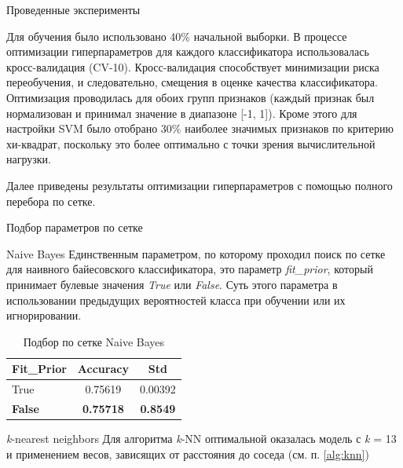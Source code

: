 

\begin{section}{Проведенные эксперименты}

Для обучения было использовано 40\% начальной выборки. В процессе оптимизации гиперпараметров для каждого классификатора использовалась кросс-валидация (CV-10). Кросс-валидация способствует минимизации риска  переобучения, и следовательно,  смещения в оценке качества классификатора. Оптимизация проводилась для обоих групп признаков (каждый признак был нормализован и принимал значение в диапазоне [-1, 1]). Кроме этого для настройки SVM было отобрано 30\% наиболее значимых признаков по критерию хи-квадрат, поскольку это более оптимально с точки зрения вычислительной нагрузки.

Далее приведены результаты оптимизации гиперпараметров с помощью полного перебора по сетке.

\begin{subsection}{Подбор параметров по сетке}

\begin{subsubsection}{Naive Bayes}
Единственным параметром, по которому проходил поиск по сетке для наивного байесовского классификатора, это параметр \textit{fit\_prior}, который принимает булевые значения \textit{True} или \textit{False}. Суть этого параметра в использовании предыдущих вероятностей класса при обучении или их игнорировании.

\begin{table}[H]
\centering
{\begin{tabular}{|l|c|c|}
\hline
\textbf{Fit\_Prior} & \textbf{Accuracy} & \textbf{Std} \\
\hline
True & 0.75619  & 0.00392 \\
\hline
\textbf{False} & \textbf{0.75718}  & \textbf{0.8549} \\
\hline
\end{tabular}}

\caption{Подбор по сетке Naive Bayes}
\label{grid:nb}
\end{table}



\end{subsubsection}



\begin{subsubsection}{\textit{k}-nearest neighbors}
  Для алгоритма \textit{k}-NN оптимальной оказалась модель с \textit{k} = 13 и применением весов, зависящих от расстояния до соседа (см. п. \ref{alg:knn})


\end{subsubsection}
\end{subsection}
\end{section}
